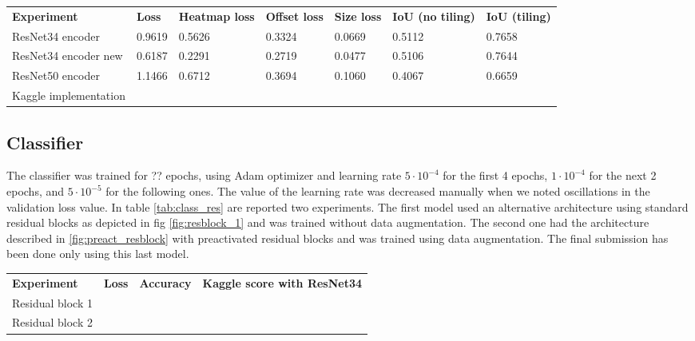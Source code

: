 \begin{table*}[h]
	\begin{tabular}{lllllll}
		\rowcolor[HTML]{EFEFEF} 
		\textbf{Experiment}   & \textbf{Loss} & \textbf{Heatmap loss} & \textbf{Offset loss} & \textbf{Size loss} & \textbf{IoU (no tiling)} & \textbf{IoU (tiling)} \\
		ResNet34 encoder      & 0.9619        & 0.5626                & 0.3324               & 0.0669             & 0.5112                   & 0.7658                \\
		ResNet34 encoder new     & 0.6187        & 0.2291                & 0.2719               & 0.0477             & 0.5106                   & 0.7644                \\
		ResNet50 encoder      & 1.1466        & 0.6712                & 0.3694               & 0.1060             & 0.4067                   & 0.6659                \\
		Kaggle implementation &               &                       &                      &                    &                          &                      
	\end{tabular}
\end{table*}

\subsection{Classifier}
\label{ssec:classifierexp}

The classifier was trained for ?? epochs, using Adam optimizer and learning rate $5 \cdot 10^{-4}$ for the first 4 epochs, $1 \cdot 10^{-4}$ for the next 2 epochs, and $5 \cdot 10^{-5}$ for the following ones. The value of the learning rate was decreased manually when we noted oscillations in the validation loss value. In table \ref{tab:class_res} are reported two experiments. The first model used an alternative architecture using standard residual blocks as depicted in fig \ref{fig:resblock_1} and was trained without data augmentation. The second one had the architecture described in \ref{fig:preact_resblock} with preactivated residual blocks and was trained using data augmentation. The final submission has been done only using this last model.

\begin{table*}[h]
	\begin{tabular}{llll}
		\rowcolor[HTML]{EFEFEF} 
		\textbf{Experiment} & \textbf{Loss} & \textbf{Accuracy} & \textbf{Kaggle score with ResNet34} \\
		Residual block 1    &               &                   &                                     \\
		Residual block 2    &               &                   &                                    
	\end{tabular}
	\label{tab:class_res}
\end{table*}

